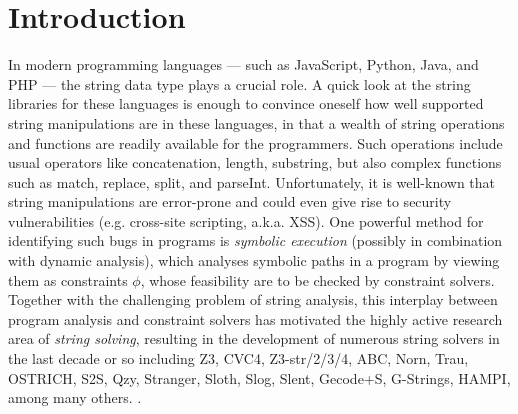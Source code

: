 
\section{Introduction}\label{sec-intro}



%
In modern programming languages --- such as JavaScript, Python, Java, and PHP 
--- the string data type plays a crucial role. 
A quick look at the string libraries for these languages is enough to convince
oneself how well supported string manipulations are in these languages, in that
a wealth of string operations and functions are readily available for the
programmers.
Such operations include usual operators like concatenation, length, substring, 
but also complex functions such as 
match, replace, split, and parseInt.
Unfortunately, it is well-known that string manipulations are error-prone and
could even give rise to
security vulnerabilities (e.g. cross-site scripting, a.k.a. XSS).
One powerful method for identifying such bugs in programs is \emph{symbolic 
execution} (possibly in combination with dynamic analysis), which
analyses symbolic paths in a program by viewing them as constraints $\phi$, 
whose feasibility are to be checked by constraint solvers. 
Together with the challenging problem of string analysis,
this interplay between program analysis and constraint solvers has motivated 
the highly active research area of \emph{string solving}, resulting in the
development of numerous string solvers in the last decade or so including
Z3, CVC4, Z3-str/2/3/4, ABC, Norn, Trau, OSTRICH, S2S, Qzy, Stranger, Sloth,
Slog, Slent, Gecode+S, G-Strings, HAMPI, among many others. \cite{??}
. %

